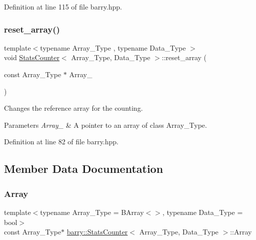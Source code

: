 Definition at line 115 of file barry.\+hpp.

\mbox{\label{classbarry_1_1_stats_counter_a8dabc3a7a9931acbb76900a67d728f70}} 
\subsubsection{\texorpdfstring{reset\+\_\+array()}{reset\_array()}}
{\footnotesize\ttfamily template$<$typename Array\+\_\+\+Type , typename Data\+\_\+\+Type $>$ \\
void \hyperlink{classbarry_1_1_stats_counter}{Stats\+Counter}$<$ Array\+\_\+\+Type, Data\+\_\+\+Type $>$\+::reset\+\_\+array (\begin{DoxyParamCaption}\item[{const Array\+\_\+\+Type $\ast$}]{Array\+\_\+ }\end{DoxyParamCaption})\hspace{0.3cm}{\ttfamily [inline]}}



Changes the reference array for the counting. 


\begin{DoxyParams}{Parameters}
{\em Array\+\_\+} & A pointer to an array of class {\ttfamily Array\+\_\+\+Type}. \\
\hline
\end{DoxyParams}


Definition at line 82 of file barry.\+hpp.



\subsection{Member Data Documentation}
\mbox{\label{classbarry_1_1_stats_counter_a4a963a5edf23d0527e1ef87c52c04a97}} 
\subsubsection{\texorpdfstring{Array}{Array}}
{\footnotesize\ttfamily template$<$typename Array\+\_\+\+Type  = B\+Array$<$$>$, typename Data\+\_\+\+Type  = bool$>$ \\
const Array\+\_\+\+Type$\ast$ \hyperlink{classbarry_1_1_stats_counter}{barry\+::\+Stats\+Counter}$<$ Array\+\_\+\+Type, Data\+\_\+\+Type $>$\+::Array}



